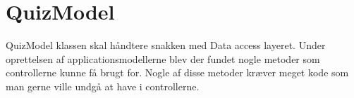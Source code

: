 \section{QuizModel}

QuizModel klassen skal håndtere snakken med Data access layeret. Under oprettelsen af applicationsmodellerne blev der fundet nogle metoder som controllerne kunne få brugt for. Nogle af disse metoder kræver meget kode som man gerne ville undgå at have i controllerne.

